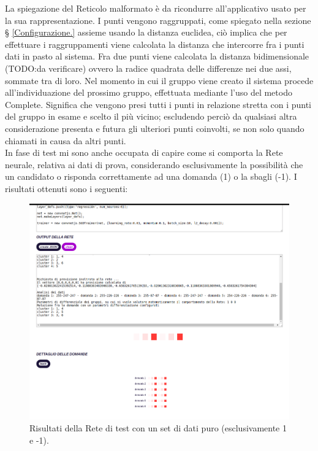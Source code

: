 \noindent
La spiegazione del Reticolo malformato \`e da ricondurre all'applicativo usato per la sua rappresentazione. I punti vengono raggruppati, come spiegato nella sezione § \ref{Configurazione.} assieme usando la distanza euclidea, ci\`o implica che per effettuare i raggruppamenti viene calcolata la distanza che intercorre fra i punti dati in pasto al sistema. Fra due punti viene calcolata la distanza bidimensionale (TODO:da verificare) ovvero la radice quadrata delle differenze  nei due assi, sommate tra di loro. Nel momento in cui il gruppo viene creato il sistema procede all'individuazione del prossimo gruppo, effettuata mediante l'uso del metodo Complete. Significa che vengono presi tutti i punti in relazione stretta con i punti del gruppo in esame e scelto il pi\`u vicino; escludendo perci\`o da qualsiasi altra considerazione presenta e futura gli ulteriori punti coinvolti, se non solo quando chiamati in causa da altri punti.\\
\noindent
In fase di test mi sono anche occupata di capire come si comporta la Rete neurale, relativa ai dati di prova, considerando esclusivamente la possibilit\`a che un candidato o risponda correttamente ad una domanda (1) o la sbagli (-1). I risultati ottenuti sono i seguenti:
\begin{figure}[H]
\centering
	\includegraphics[width=1\linewidth]{./image/RetediProva_generatorinputpuro.png}
	\caption{Risultati della Rete di test con un set di dati puro (esclusivamente 1 e -1).}
	\label{Risultati della Rete di test con un set di dati puro (esclusivamente 1 e -1).}
	\end{figure}
